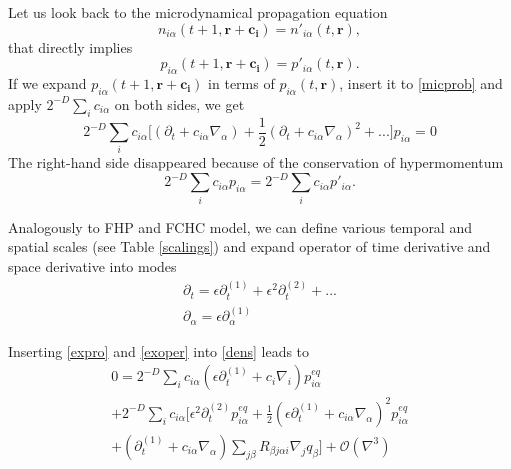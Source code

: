 Let us look back to the microdynamical propagation equation
\begin{equation}
n_{i\alpha}(t+1,\bm{r} + \bm{c_i}) = n'_{i\alpha}(t, \bm{r}),
\end{equation}
that directly implies
\begin{equation} \label{micprob}
p_{i\alpha}(t+1, \bm{r} + \bm{c_i}) = p'_{i\alpha}(t, \bm{r}).
\end{equation}
If we expand $p_{i\alpha}(t+1, \bm{r} + \bm{c_i})$ in terms of $p_{i\alpha}(t,\bm{r})$, insert it to \ref{micprob} and apply $2^{-D}\sum_i c_{i\alpha}$ on both sides, we get
\begin{equation} \label{dens}
2^{-D} \sum_i c_{i\alpha} \big[(\partial_t + c_{i\alpha}\nabla_{\alpha}) + \frac{1}{2}(\partial_t + c_{i\alpha}\nabla_{\alpha})^2 + ... \big] p_{i\alpha} = 0
\end{equation}
The right-hand side disappeared because of the conservation of hypermomentum
\begin{equation}
2^{-D} \sum_i c_{i\alpha} p_{i\alpha} = 2^{-D} \sum_i c_{i\alpha} p'_{i\alpha}.
\end{equation}


Analogously to FHP and FCHC model, we can define various temporal and spatial scales (see Table \ref{scalings}) and expand operator of time derivative and space derivative into modes
\begin{equation} \label{exoper}
\begin{split}
\partial_t = \epsilon \partial_t^{(1)} + \epsilon^2 \partial_t^{(2)} + ...\\
\partial_{\alpha} = \epsilon \partial_{\alpha}^{(1)}
\end{split}
\end{equation}

Inserting \ref{expro} and \ref{exoper} into \ref{dens} leads to
\begin{equation}
\begin{split}
0 = 2^{-D} \sum_i c_{i\alpha}(\epsilon\partial_{t}^{(1)} + c_i \nabla_i) p_{i\alpha}^{eq} \\
+ 2^{-D} \sum_i c_{i\alpha}\big[\epsilon^2 \partial_t^{(2)} p_{i\alpha}^{eq} + \frac{1}{2}(\epsilon \partial_t^{(1)} + c_{i\alpha} \nabla_{\alpha})^2 p_{i\alpha}^{eq} \\
+ (\partial_t^{(1)} + c_{i\alpha} \nabla_{\alpha})\sum_{j \beta} R_{\beta j \alpha i}\nabla_{j}q_{\beta} \big] + \mathcal{O}(\nabla^3)
\end{split}
\end{equation}

